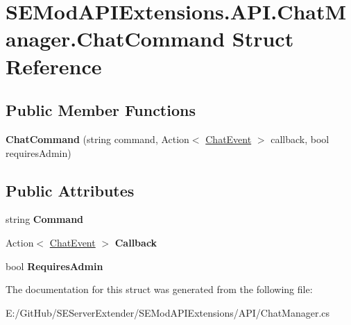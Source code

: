 \hypertarget{struct_s_e_mod_a_p_i_extensions_1_1_a_p_i_1_1_chat_manager_1_1_chat_command}{}\section{S\+E\+Mod\+A\+P\+I\+Extensions.\+A\+P\+I.\+Chat\+Manager.\+Chat\+Command Struct Reference}
\label{struct_s_e_mod_a_p_i_extensions_1_1_a_p_i_1_1_chat_manager_1_1_chat_command}
\subsection*{Public Member Functions}
\begin{DoxyCompactItemize}
\item 
\hypertarget{struct_s_e_mod_a_p_i_extensions_1_1_a_p_i_1_1_chat_manager_1_1_chat_command_a2d9775b580f9432e9a883df6f8e9c124}{}{\bfseries Chat\+Command} (string command, Action$<$ \hyperlink{struct_s_e_mod_a_p_i_extensions_1_1_a_p_i_1_1_chat_manager_1_1_chat_event}{Chat\+Event} $>$ callback, bool requires\+Admin)\label{struct_s_e_mod_a_p_i_extensions_1_1_a_p_i_1_1_chat_manager_1_1_chat_command_a2d9775b580f9432e9a883df6f8e9c124}

\end{DoxyCompactItemize}
\subsection*{Public Attributes}
\begin{DoxyCompactItemize}
\item 
\hypertarget{struct_s_e_mod_a_p_i_extensions_1_1_a_p_i_1_1_chat_manager_1_1_chat_command_a7d1d3aad535ad1ca5821a7cf501dedd5}{}string {\bfseries Command}\label{struct_s_e_mod_a_p_i_extensions_1_1_a_p_i_1_1_chat_manager_1_1_chat_command_a7d1d3aad535ad1ca5821a7cf501dedd5}

\item 
\hypertarget{struct_s_e_mod_a_p_i_extensions_1_1_a_p_i_1_1_chat_manager_1_1_chat_command_a36f0ee5d5f20cdfe8658c62b2cc875b1}{}Action$<$ \hyperlink{struct_s_e_mod_a_p_i_extensions_1_1_a_p_i_1_1_chat_manager_1_1_chat_event}{Chat\+Event} $>$ {\bfseries Callback}\label{struct_s_e_mod_a_p_i_extensions_1_1_a_p_i_1_1_chat_manager_1_1_chat_command_a36f0ee5d5f20cdfe8658c62b2cc875b1}

\item 
\hypertarget{struct_s_e_mod_a_p_i_extensions_1_1_a_p_i_1_1_chat_manager_1_1_chat_command_ac0b9468bfb3f3c1d9885cdb7420809f3}{}bool {\bfseries Requires\+Admin}\label{struct_s_e_mod_a_p_i_extensions_1_1_a_p_i_1_1_chat_manager_1_1_chat_command_ac0b9468bfb3f3c1d9885cdb7420809f3}

\end{DoxyCompactItemize}


The documentation for this struct was generated from the following file\+:\begin{DoxyCompactItemize}
\item 
E\+:/\+Git\+Hub/\+S\+E\+Server\+Extender/\+S\+E\+Mod\+A\+P\+I\+Extensions/\+A\+P\+I/Chat\+Manager.\+cs\end{DoxyCompactItemize}
